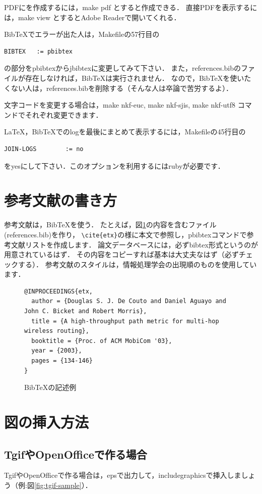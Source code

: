 \documentclass[submit,techreq,noauthor,dvipdfmx]{eco}	%
\begin{document}
PDFにを作成するには，make pdf とすると作成できる．
直接PDFを表示するには，make view とするとAdobe Readerで開いてくれる．

BibTeXでエラーが出た人は，Makefileの57行目の
\begin{lstlisting}
BIBTEX   := pbibtex
\end{lstlisting}
の部分をpbibtexからjbibtexに変更してみて下さい．
また，references.bibのファイルが存在しなければ，BibTeXは実行されません．
なので，BibTeXを使いたくない人は，references.bibを削除する（そんな人は卒論で苦労するよ）．

文字コードを変更する場合は，make nkf-euc, make nkf-sjis, make nkf-utf8 コマンドでそれぞれ変更できます．

LaTeX，BibTeXでのlogを最後にまとめて表示するには，Makefileの45行目の
\begin{lstlisting}
JOIN-LOGS        := no
\end{lstlisting}
をyesにして下さい．このオプションを利用するにはrubyが必要です．


\section{参考文献の書き方}
参考文献は，BibTeXを使う．
たとえば，図\ref{fig:bibsample}の内容を含むファイル(references.bib)を作り，
\verb|\cite{etx}|の様に本文で参照\cite{etx}し，pbibtexコマンドで参考文献リストを作成します．
論文データベースには，必ずbibtex形式というのが用意されているはず．
その内容をコピーすれば基本は大丈夫なはず（必ずチェックする）．
参考文献のスタイルは，情報処理学会の出現順のものを使用しています．

\begin{figure}[t]
    \centering
    \begin{lstlisting}
@INPROCEEDINGS{etx,
  author = {Douglas S. J. De Couto and Daniel Aguayo and John C. Bicket and Robert Morris},
  title = {A high-throughput path metric for multi-hop wireless routing},
  booktitle = {Proc. of ACM MobiCom '03},
  year = {2003},
  pages = {134-146}
}
    \end{lstlisting}
    \vspace{-2mm}
    \caption{BibTeXの記述例}
    \label{fig:bibsample}
\end{figure}


\section{図の挿入方法}
\subsection{TgifやOpenOfficeで作る場合}
TgifやOpenOfficeで作る場合は，epsで出力して，includegraphicsで挿入しましょう（例:図\ref{fig:tgif-sample}）．
\end{document}
